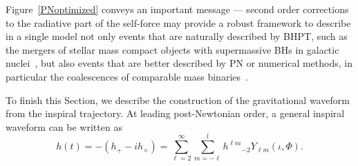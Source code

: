 Figure~\ref{PNoptimized} conveys an important message --- second order 
corrections to the radiative part of the self-force may provide a robust 
framework to describe in a single model not only events that are naturally 
described by BHPT, such as the mergers of stellar mass compact objects with
supermassive BHs in galactic nuclei~\cite{Huerta:2012, Huerta:2010, wargar,
cutler, gairles, SFB, GairL:2013}, but also events that are better described
by PN or numerical methods, in particular the coalescences of comparable
mass binaries~\cite{Huerta:2012, higherspin, Huerta:2011a, Huerta:2011b, smallbody}.

To finish this Section, we describe the construction of the gravitational
waveform from the inspiral trajectory. At leading post-Newtonian order, a 
general inspiral waveform can be written as
\begin{equation}
h(t) = -(h_{+} - i h_{\times}) = \sum_{\ell=2}^{\infty} \sum_{m=-\ell}^{l} h^{\ell m} {}_{-\!2}Y_{\ell m}(\iota,\Phi).
\label{inspwav}
\end{equation}

